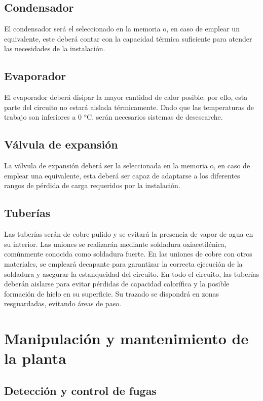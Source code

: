 \documentclass[../main.tex]{subfiles}
\begin{document}
\subsection{Condensador}

El condensador será el seleccionado en la memoria o, en caso de emplear un equivalente, este deberá contar con la capacidad térmica suficiente para atender las necesidades de la instalación.

\subsection{Evaporador}

El evaporador deberá disipar la mayor cantidad de calor posible; por ello, esta parte del circuito no estará aislada térmicamente. Dado que las temperaturas de trabajo son inferiores a 0 °C, serán necesarios sistemas de desescarche.

\subsection{Válvula de expansión}

La válvula de expansión deberá ser la seleccionada en la memoria o, en caso de emplear una equivalente, esta deberá ser capaz de adaptarse a los diferentes rangos de pérdida de carga requeridos por la instalación.

\subsection{Tuberías}

Las tuberías serán de cobre pulido y se evitará la presencia de vapor de agua en su interior. Las uniones se realizarán mediante soldadura oxiacetilénica, comúnmente conocida como soldadura fuerte. En las uniones de cobre con otros materiales, se empleará decapante para garantizar la correcta ejecución de la soldadura y asegurar la estanqueidad del circuito. En todo el circuito, las tuberías deberán aislarse para evitar pérdidas de capacidad calorífica y la posible formación de hielo en su superficie. Su trazado se dispondrá en zonas resguardadas, evitando áreas de paso.

\newpage

\section{Manipulación y mantenimiento de la planta}

\subsection{Detección y control de fugas}
\end{document}
